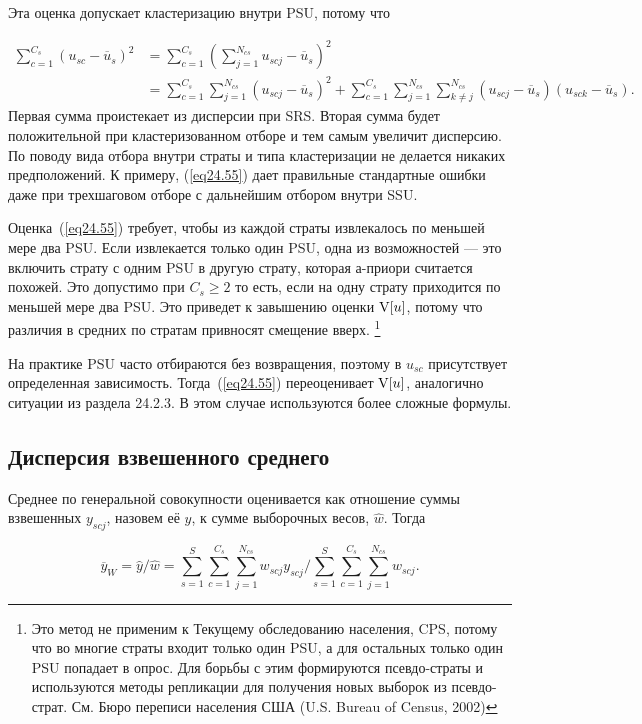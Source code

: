 Эта оценка допускает кластеризацию внутри PSU, потому что 

\begin{align}
\sum_{c=1}^{C_s} (u_{sc} - \overline{u}_s)^2 & = \sum_{c=1}^{C_s} \left(  \sum_{j=1}^{N_{cs}} u_{scj} -  \overline{u}_s \right)^2 \nonumber\\
& =\sum_{c=1}^{C_s} \sum_{j=1}^{N_{cs}} (u_{scj} - \overline{u}_s)^2 + \sum_{c=1}^{C_s} \sum_{j=1}^{N_{cs}} \sum_{k \ne j}^{N_{cs}} (u_{scj} - \overline{u}_s)(u_{sck} - \overline{u}_s). \nonumber
\end{align}
Первая сумма проистекает из дисперсии при SRS. Вторая сумма будет положительной при кластеризованном отборе и тем самым увеличит дисперсию. По поводу вида отбора внутри страты и типа кластеризации не делается никаких предположений. К примеру, (\ref{eq24.55}) дает правильные стандартные ошибки даже при трехшаговом отборе с дальнейшим отбором внутри SSU. 

Оценка~(\ref{eq24.55}) требует, чтобы из каждой страты извлекалось по меньшей мере два PSU. Если извлекается только один PSU, одна из возможностей --- это включить страту с одним PSU в другую страту, которая а-приори считается похожей. Это допустимо при $C_s \ge 2$ то есть, если на одну страту приходится по меньшей мере два PSU. Это приведет к завышению оценки $\mathrm{V}[u]$, потому что различия в средних по стратам привносят смещение вверх. \footnote{Это метод не применим к Текущему обследованию населения, CPS, потому что во многие страты входит только один PSU, а для остальных только один PSU попадает в опрос. Для борьбы с этим формируются псевдо-страты и используются методы репликации для получения новых выборок из псевдо-страт. См. Бюро переписи населения США (U.S. Bureau of Census, 2002)}

На практике PSU часто отбираются без возвращения, поэтому в $u_{sc}$ присутствует определенная зависимость. Тогда~(\ref{eq24.55}) переоценивает $\mathrm{V}[u]$, аналогично ситуации из раздела 24.2.3. В этом случае используются более сложные формулы. 

\subsection*{Дисперсия взвешенного среднего}

Среднее по генеральной совокупности оценивается как отношение суммы взвешенных $y_{scj}$, назовем её $\hat y$, к сумме выборочных весов, $\hat w$. Тогда

$$
\overline{y}_W = \hat y / \hat w = \sum_{s=1}^S \sum_{c=1}^{C_s} \sum_{j=1}^{N_{cs}} w_{scj} y_{scj} \bigl/  \sum_{s=1}^S \sum_{c=1}^{C_s} \sum_{j=1}^{N_{cs}} w_{scj}.
$$

